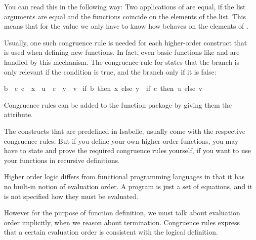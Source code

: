 \begin{isabellebody}
\begin{isamarkuptxt}
  You can read this in the following way: Two applications of  are equal, if the list arguments are equal and the functions
  coincide on the elements of the list. This means that for the value 
   we only have to know how  behaves on
  the elements of .

  Usually, one such congruence rule is
  needed for each higher-order construct that is used when defining
  new functions. In fact, even basic functions like  and  are handled by this mechanism. The congruence
  rule for  states that the  branch is only
  relevant if the condition is true, and the  branch only if it
  is false:

  \begin{isabelle}%
{\isasymlbrakk}{\isacharquery}b\ {\isacharequal}\ {\isacharquery}c{\isacharsemicolon}\ {\isacharquery}c\ {\isasymLongrightarrow}\ {\isacharquery}x\ {\isacharequal}\ {\isacharquery}u{\isacharsemicolon}\ {\isasymnot}\ {\isacharquery}c\ {\isasymLongrightarrow}\ {\isacharquery}y\ {\isacharequal}\ {\isacharquery}v{\isasymrbrakk}\isanewline
{\isasymLongrightarrow}\ {\isacharparenleft}if\ {\isacharquery}b\ then\ {\isacharquery}x\ else\ {\isacharquery}y{\isacharparenright}\ {\isacharequal}\ {\isacharparenleft}if\ {\isacharquery}c\ then\ {\isacharquery}u\ else\ {\isacharquery}v{\isacharparenright}%
\end{isabelle}
  
  Congruence rules can be added to the
  function package by giving them the  attribute.

  The constructs that are predefined in Isabelle, usually
  come with the respective congruence rules.
  But if you define your own higher-order functions, you may have to
  state and prove the required congruence rules yourself, if you want to use your
  functions in recursive definitions.%
\end{isamarkuptxt}%
\isamarkuptrue%
%
\endisatagproof
{\isafoldproof}%
%
\isadelimproof
%
\endisadelimproof
%
\isamarkuptrue%
%
\begin{isamarkuptext}%
Higher order logic differs from functional programming languages in
  that it has no built-in notion of evaluation order. A program is
  just a set of equations, and it is not specified how they must be
  evaluated. 

  However for the purpose of function definition, we must talk about
  evaluation order implicitly, when we reason about termination.
  Congruence rules express that a certain evaluation order is
  consistent with the logical definition. 


\end{isamarkuptext}
\end{isabellebody}
